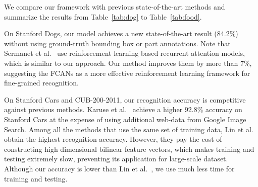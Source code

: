 \documentclass[10pt,twocolumn,letterpaper]{article}
\begin{document}
We compare our framework with previous state-of-the-art methods and summarize the results from Table~\ref{tab:dog} to Table~\ref{tab:food}.

On Stanford Dogs, our model achieves a new state-of-the-art result (84.2\%) without using ground-truth bounding box or part annotations.
Note that Sermanet et al.~\cite{bd3} use reinforcement learning based recurrent attention models, which is similar to our approach.
Our method improves them by more than 7\%, suggesting the FCANs as a more effective reinforcement learning framework for fine-grained recognition.

On Stanford Cars and CUB-200-2011, our recognition accuracy is competitive against previous methods.
Karuse et al.~\cite{bd21} achieve a higher 92.8\% accuracy on Stanford Cars at the expense of using additional web-data from Google Image Search.
Among all the methods that use the same set of training data, Lin et al.~\cite{bd16} obtain the highest recognition accuracy.
However, they pay the cost of constructing high dimensional bilinear feature vectors, which makes training and testing extremely slow, preventing its application for large-scale dataset.
Although our accuracy is lower than Lin et al.~\cite{bd16}, we use much less time for training and testing.

\end{document}
